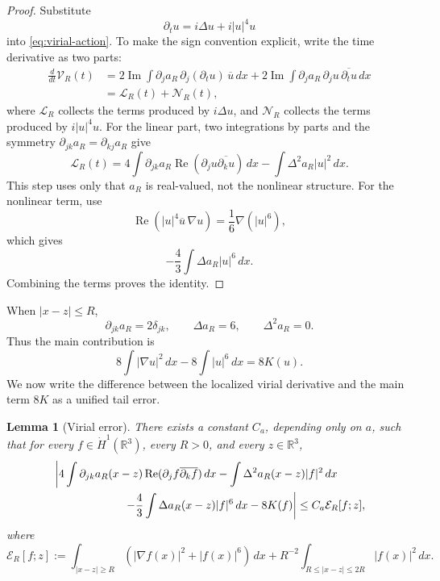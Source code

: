 \documentclass[smallextended,envcountsect,nospthms]{svjour3}
\numberwithin{equation}{section}
\theoremstyle{spbreak}
\newtheorem{lemma}[theorem]{Lemma}
\theoremstyle{spdefbreak}
\theoremstyle{spdefbreak}
\newcommand{\R}{\mathbb R}
\begin{document}
\begin{proof}
Substitute
\begin{equation*}
  \partial_tu=i\Delta u+i|u|^4u
\end{equation*}
into \eqref{eq:virial-action}. To make the sign convention explicit, write the time derivative as two parts:
\[
\begin{aligned}
  \frac{d}{dt}\mathcal V_R(t)
  &=2\operatorname{Im}\int \partial_j a_R\,\partial_j(\partial_tu)\,\overline u\,dx
    +2\operatorname{Im}\int \partial_j a_R\,\partial_j u\,\overline{\partial_tu}\,dx \\
  &=\mathcal L_R(t)+\mathcal N_R(t),
\end{aligned}
\]
where $\mathcal L_R$ collects the terms produced by $i\Delta u$, and $\mathcal N_R$ collects the terms produced by $i|u|^4u$. For the linear part, two integrations by parts and the symmetry $\partial_{jk}a_R=\partial_{kj}a_R$ give
\[
  \mathcal L_R(t)
  =4\int \partial_{jk}a_R\operatorname{Re}(\partial_j u\overline{\partial_k u})\,dx
   -\int \Delta^2a_R |u|^2\,dx.
\]
This step uses only that $a_R$ is real-valued, not the nonlinear structure. For the nonlinear term, use
\begin{equation*}
  \operatorname{Re}(|u|^4\overline u\,\nabla u)=\frac16\nabla(|u|^6),
\end{equation*}
which gives
\begin{equation*}
  -\frac43\int\Delta a_R|u|^6\,dx.
\end{equation*}
Combining the terms proves the identity.
\end{proof}

When $|x-z|\le R$,
\begin{equation}\label{eq:quadratic-derivatives}
  \partial_{jk}a_R=2\delta_{jk},
  \qquad \Delta a_R=6,
  \qquad \Delta^2a_R=0.
\end{equation}
Thus the main contribution is
\begin{equation*}
  8\int|\nabla u|^2\,dx-8\int|u|^6\,dx=8K(u).
\end{equation*}
We now write the difference between the localized virial derivative and the main term $8K$ as a unified tail error.

\begin{lemma}[Virial error]\label{lem:virial-error}
There exists a constant $C_a$, depending only on $a$, such that for every $f\in\dot H^1(\R^3)$, every $R>0$, and every $z\in\R^3$,
\begin{align*}
  &\left|
  4\int \partial_{jk}a_R(x-z)\operatorname{Re}(\partial_jf\overline{\partial_kf})\,dx
  -\int \Delta^2a_R(x-z)|f|^2\,dx \right.\\
  &\left.\hspace{2.2cm}
  -\frac43\int \Delta a_R(x-z)|f|^6\,dx
  -8K(f)
  \right|
  \le C_a\mathcal E_R[f;z],
\end{align*}
where
\begin{equation}\label{eq:error-functional}
  \mathcal E_R[f;z]
  :=\int_{|x-z|\ge R}(|\nabla f(x)|^2+|f(x)|^6)\,dx
  +R^{-2}\int_{R\le|x-z|\le2R}|f(x)|^2\,dx.
\end{equation}
\end{lemma}
\end{document}
